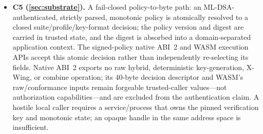 \documentclass[journal]{IEEEtran}
\begin{document}
\begin{itemize}
\item \textbf{C5 (\cref{sec:substrate}).} A fail-closed policy-to-byte path: an ML-DSA-authenticated,
strictly parsed, monotonic policy is atomically resolved to a closed suite/profile/key-format
decision; the policy version and digest are carried in trusted state, and the digest is absorbed into
a domain-separated application context. The signed-policy native ABI~2 and WASM execution APIs
accept this atomic decision rather than independently re-selecting its fields. Native ABI~2 exports
no raw hybrid, deterministic key-generation, X-Wing, or combine operation; its 40-byte decision
descriptor and WASM's raw/conformance inputs remain forgeable trusted-caller values---not authorization
capabilities---and are excluded from the authentication claim. A hostile local caller
requires a service/process that owns the pinned verification key and monotonic state; an opaque
handle in the same address space is insufficient.
\end{itemize}
\end{document}
